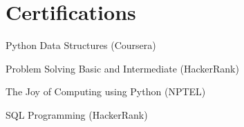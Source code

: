 \documentclass[a4paper,20pt]{article}
\begin{document}
\vspace{-5pt}
\section{Certifications}
\begin{description}[font=$\bullet$]
\item {Python Data Structures (Coursera)}
\vspace{-5pt}
\item {Problem Solving Basic and Intermediate (HackerRank)}
\vspace{-5pt}
\item {The Joy of Computing using Python (NPTEL)}
\vspace{-5pt}
\item {SQL Programming (HackerRank)}
\end{description}
\end{document}
